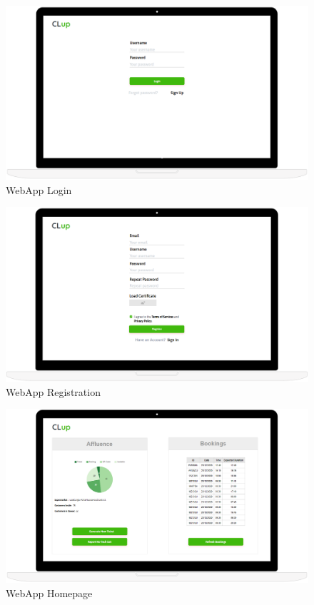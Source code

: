 \begin{figure} [H]
\includegraphics[width=\textwidth]{./Images/MockupLogo/mockLoginLaptop}
\caption{WebApp Login}
\end{figure}
\begin{figure} [H]
\includegraphics[width=\textwidth]{./Images/MockupLogo/mockRegistrationLaptop}
\caption{WebApp Registration}
\end{figure}
\begin{figure} [H]
\includegraphics[width=\textwidth]{./Images/MockupLogo/mockLaptop}
\caption{WebApp Homepage}
\end{figure}
